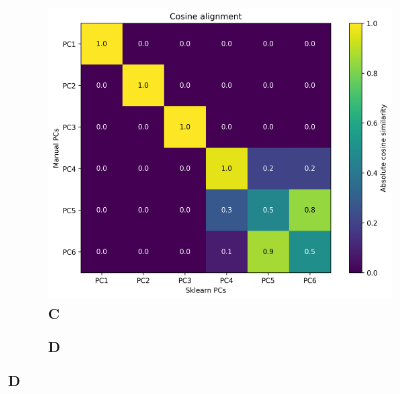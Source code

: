 \documentclass[11pt,a4paper]{article}
\begin{document}
\begin{figure}[H]
\begin{subfigure}{0.45\textwidth}
\end{subfigure}

\vspace{0.5cm}

\begin{subfigure}{0.45\textwidth}
    \centering
    \caption*{\textbf{C}}
    \includegraphics[width=\textwidth]{cosine_alignment.png}
\end{subfigure}
\hfill
\begin{subfigure}{0.45\textwidth}
    \centering
    \caption*{\textbf{D}}

\end{subfigure}
\end{figure}
\end{document}
